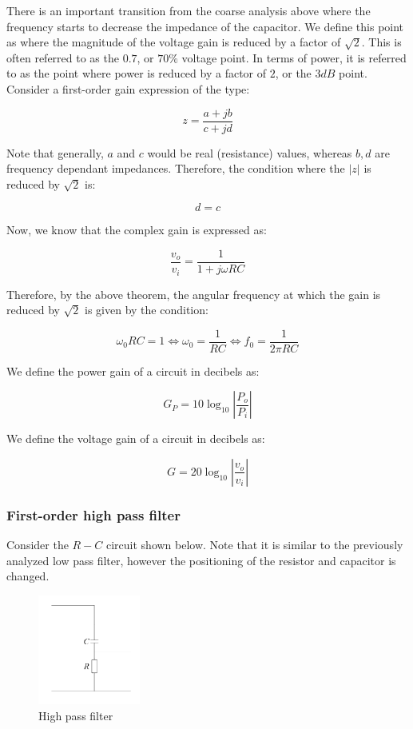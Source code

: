 \documentclass{article}
\begin{document}
There is an important transition from the coarse analysis above where the frequency starts to decrease the impedance of the capacitor. We define this point as where the magnitude of the voltage gain is reduced by a factor of $\sqrt{2}$. This is often referred to as the $0.7$, or $70\%$ voltage point. In terms of power, it is referred to as the point where power is reduced by a factor of $2$, or the $3dB$ point. Consider a first-order gain expression of the type:

\[ z = \frac{a + jb}{c + jd} \]

Note that generally, $a$ and $c$ would be real (resistance) values, whereas $b, d$ are frequency dependant impedances. Therefore, the condition where the $|z|$ is reduced by $\sqrt{2}$ is:

\[ d = c \]

Now, we know that the complex gain is expressed as:

\[ \frac{v_o}{v_i} = \frac{1}{1 + j\omega RC} \]

Therefore, by the above theorem, the angular frequency at which the gain is reduced by $\sqrt{2}$ is given by the condition:

\[ \omega_0RC = 1 \iff \omega_0 = \frac{1}{RC} \iff f_0 = \frac{1}{2\pi RC} \]

\begin{definition}
    We define the power gain of a circuit in decibels as:

    \[ G_P = 10\log_{10}\left|\frac{P_o}{P_i}\right| \]
\end{definition}

\begin{definition}
    We define the voltage gain of a circuit in decibels as:

    \[ G = 20\log_{10}\left|\frac{v_o}{v_i}\right| \]
\end{definition}

\subsubsection{First-order high pass filter}

Consider the $R-C$ circuit shown below. Note that it is similar to the previously analyzed low pass filter, however the positioning of the resistor and capacitor is changed.

\begin{figure}[h]
    \centering
    \includegraphics[width=0.3\textwidth]{images/filter2.png}
    \caption{High pass filter}
    \label{fig:filter-high}
\end{figure}
\end{document}
